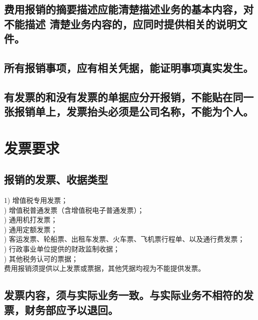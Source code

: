 \documentclass[]{article}
\begin{document}
\subsection{费用报销的摘要描述应能清楚描述业务的基本内容，对不能描述
清楚业务内容的，应同时提供相关的说明文件。}
\subsection{所有报销事项，应有相关凭据，能证明事项真实发生。}
\subsection{有发票的和没有发票的单据应分开报销，不能贴在同一张报销单上，发票抬头必须是公司名称，不能为个人。}

\section{发票要求}
\subsection{报销的发票、收据类型}
1)	增值税专用发票；\\)	增值税普通发票（含增值税电子普通发票）；\\)	通用机打发票；\\)	通用定额发票；\\)	客运发票、轮船票、出租车发票、火车票、飞机票行程单、以及通行费发票；\\)	行政事业单位提供的财政监制收据；\\)	其他税务认可的票据；\\\indent
费用报销须提供以上发票或票据，其他凭据均视为不能提供发票。
\subsection{发票内容，须与实际业务一致。与实际业务不相符的发票，财务部应予以退回。}
\end{document}
